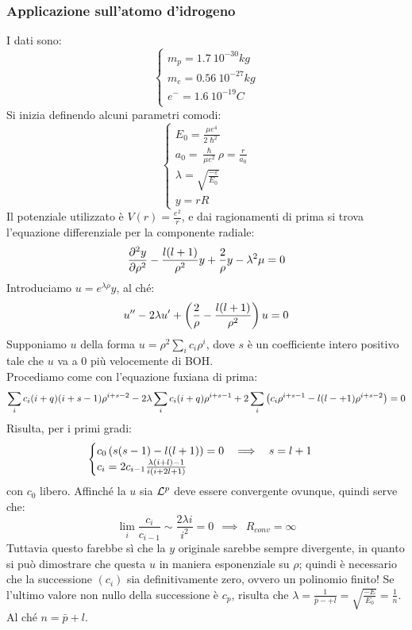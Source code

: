 \subsubsection*{Applicazione sull'atomo d'idrogeno}
I dati sono:
\[
    \begin{cases}
        m_p = 1.7\ 10^{-30}kg\\
        m_e = 0.56\ 10^{-27}kg\\
        e^- = 1.6\ 10^{-19}C\\
    \end{cases}
\]
Si inizia definendo alcuni parametri comodi:
\[
    \begin{cases}
        E_0 = \frac{\mu e^4}{2\hslash^2}\\
        a_0 = \frac{\hslash}{\mu e^2}
        \rho = \frac{r}{a_0} \\
        \lambda = \sqrt{\frac{-\varepsilon}{E_0}}\\
        y = rR
    \end{cases}
\]
Il potenziale utilizzato è $V(r) = \frac{e^2}{r}$, e dai ragionamenti di prima si trova l'equazione differenziale per la componente radiale:
\[
    \sderiv[\rho]{y} - \frac{l(l+1)}{\rho^2}y + \frac{2}{\rho}y - \lambda^2\mu = 0
\]
Introduciamo $u = e^{\lambda \rho}y$, al ché:
\[
    u'' - 2\lambda u'+ \l \frac{2}{\rho} - \frac{l(l+1)}{\rho^2} \r u = 0
\]
Supponiamo $u$ della forma $u = \rho^2 \sum_i c_i\rho^i$, dove $s$ è un coefficiente intero positivo tale che $u$ va a 0 più velocemente di BOH. \\
Procediamo come con l'equazione fuxiana di prima:
\[
    \sum_i c_i (i+q)(i+s-1)\rho^{i+s-2} - 2\lambda \sum_i c_i (i+q)\rho^{i+s-1} + 2  \sum_i \l c_i \rho^{i+s-1} - l(l-+1)\rho^{i+s-2} \r = 0
\]
Risulta, per i primi gradi:
\[
    \begin{cases}
        c_0 \l s(s-1) - l(l+1) \r = 0\ \ \implies\ \ s = l + 1  \\
        c_i = 2c_{i-1}\frac{\lambda (i+l) - 1}{i(i+2l+1)}
    \end{cases}
\]
con $c_0$ libero. Affinché la $u$ sia $\L^p$ deve essere convergente ovunque, quindi serve che:
\[
    \lim_i \frac{c_i}{c_{i-1}} \sim \frac{2\lambda i}{i^2} = 0 \ \ \implies \ \ R_{conv} = \infty
\]
Tuttavia questo farebbe sì che la $y$ originale sarebbe sempre divergente, in quanto si può dimostrare che questa $u$ in maniera esponenziale su $\rho$; quindi è necessario che la successione $(c_i)$ sia definitivamente zero, ovvero un polinomio finito! Se l'ultimo valore non nullo della successione è $c_p$, risulta che $\lambda = \frac{1}{\bar p -+ l} = \sqrt{\frac{-E}{E_0}} = \frac{1}{n}$. Al ché $n = \bar p + l$.

